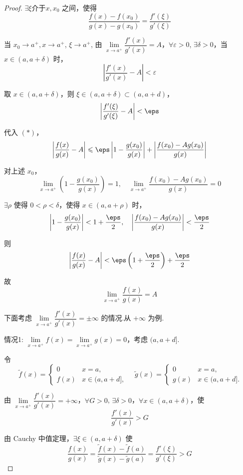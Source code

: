 \begin{proof}
	$\exists \xi $介于$x, x_0$ 之间，使得
	\[
	\frac{f(x) - f(x_0)}{g(x) - g(x_0)} = \frac{f'(\xi)}{g'(\xi)}
	\]
	
	当 $x_0 \to a^+,x \to a^+$, $\xi \to a^+$, 由 $\lim\limits_{x \to a^+} \dfrac{f'(x)}{g'(x)} = A$，$\forall \varepsilon > 0$, $\exists \delta > 0$，当 $x \in (a, a+\delta)$ 时，
	\[
	\left|\frac{f'(x)}{g'(x)} - A\right| < \varepsilon
	\]
	
	取 $x \in (a, a+\delta)$，则 $\xi \in (a, a+\delta) \subset (a, a+d)$，
	\[
	\left|\frac{f'(\xi)}{g'(\xi)} - A\right| < \eps
	\]
	
	代入 $(*)$，
	\[
	\left|\frac{f(x)}{g(x)} - A\right| \leqslant 
	\eps \left|1 - \frac{g(x_0)}{g(x)}\right|+\left|\frac{f(x_0) - A g(x_0)}{g(x)}\right|
	\]
	
	对上述 $x_0$，
	\[
	\lim_{x \to a^+} \left(1 - \frac{g(x_0)}{g(x)}\right) = 1, \quad \lim_{x \to a^+} \frac{f(x_0) - A g(x_0)}{g(x)} = 0
	\]
	
	$\exists \rho$ 使得 $0 < \rho < \delta$，使得 $x \in (a, a+\rho)$ 时，
	\[
	\left|1 - \frac{g(x_0)}{g(x)}\right| < 1 + \frac{\eps}{2}, \quad \left|\frac{f(x_0) - A g(x_0)}{g(x)}\right| < \frac{\eps}{2}
	\]
	
	则
	\[
	\left|\frac{f(x)}{g(x)} - A\right| < \eps \left(1 + \frac{\eps}{2}\right) + \frac{\eps}{2}
	\]
	
	故
	\[
	\lim_{x \to a^+} \frac{f(x)}{g(x)} = A
	\]
	
	下面考虑 $\lim\limits_{x \to a^+} \dfrac{f'(x)}{g'(x)} = \pm\infty$ 的情况.从 $+\infty$ 为例.
	
	情况1: $\lim\limits_{x \to a^+} f(x) = \lim\limits_{x \to a^+} g(x) = 0$，考虑 $(a, a+d]$.
	
	令
	\[
	\ \widetilde{f}(x) = \begin{cases}
		0 & x = a, \\
		f(x) & x \in (a, a+d],
	\end{cases}
	\quad
	\widetilde{g}(x) = \begin{cases}
		0 & x = a, \\
		g(x) & x \in (a, a+d].
	\end{cases}
	\]
	
	由 $\lim\limits_{x \to a^+} \dfrac{f'(x)}{g'(x)} = +\infty$，$\forall G > 0$, $\exists \delta > 0$，$\forall x \in (a, a+\delta)$，使
	\[
	\frac{f'(x)}{g'(x)} > G
	\]
	
	由 Cauchy 中值定理，$\exists \xi \in (a, a+\delta)$ 使
	\[
	\frac{f(x)}{g(x)} = \frac{\widetilde{f}(x) - \widetilde{f}(a)}{\widetilde{g}(x) - \widetilde{g}(a)} = \frac{f'(\xi)}{g'(\xi)} > G
	\]
	

\end{proof}
